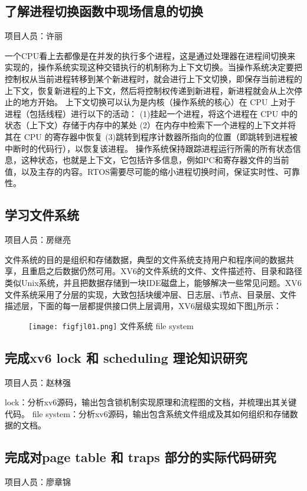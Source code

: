 \subsection{了解进程切换函数中现场信息的切换}
项目人员：许丽

一个CPU看上去都像是在并发的执行多个进程，这是通过处理器在进程间切换来实现的，操作系统实现这种交错执行的机制称为上下文切换。当操作系统决定要把控制权从当前进程转移到某个新进程时，就会进行上下文切换，即保存当前进程的上下文，恢复新进程的上下文，然后将控制权传递到新进程，新进程就会从上次停止的地方开始。
上下文切换可以认为是内核（操作系统的核心）在 CPU 上对于进程（包括线程）进行以下的活动：
(1)挂起一个进程，将这个进程在 CPU 中的状态（上下文）存储于内存中的某处
(2）在内存中检索下一个进程的上下文并将其在 CPU 的寄存器中恢复
(3)跳转到程序计数器所指向的位置（即跳转到进程被中断时的代码行），以恢复该进程。
操作系统保持跟踪进程运行所需的所有状态信息，这种状态，也就是上下文，它包括许多信息，例如PC和寄存器文件的当前值，以及主存的内容。RTOS需要尽可能的缩小进程切换时间，保证实时性、可靠性。

\subsection{学习文件系统}
项目人员：房继亮

文件系统的目的是组织和存储数据，典型的文件系统支持用户和程序间的数据共享，且重启之后数据仍然可用。XV6的文件系统的文件、文件描述符、目录和路径类似Unix系统，并且把数据存储到一块IDE磁盘上，能够解决一些常见问题。XV6文件系统采用了分层的实现，大致包括块缓冲层、日志层、i节点、目录层、文件描述层，下面的每一层都提供接口供上层调用，XV6层级实现如下图\ref{fig:figfjl01}所示：
\begin{figure}[!htb]
	\centering
	\texttt{[image: figfjl01.png]}
	\bicaption
	{文件系统} %
	{file system}  %
	\label{fig:figfjl01}
\end{figure}

\subsection{完成xv6 lock 和 scheduling 理论知识研究}
项目人员：赵林强

lock：分析xv6源码，输出包含锁机制实现原理和流程图的文档，并梳理出其关键代码。
file system：分析xv6源码，输出包含系统文件组成及其如何组织和存储数据的文档。
\subsection{完成对page table 和 traps 部分的实际代码研究}
项目人员：廖章锦

